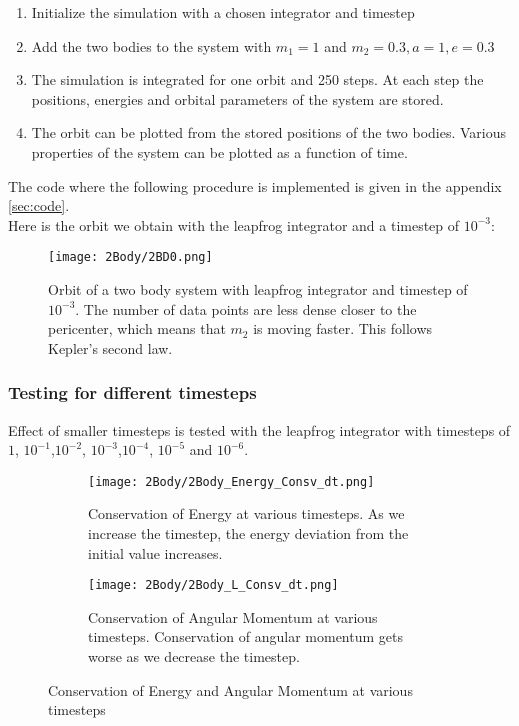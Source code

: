 \documentclass[12pt,a4paper]{article}
\begin{document}
\begin{enumerate}
  \item Initialize the simulation with a chosen integrator and timestep
  \item Add the two bodies to the system with $m_1 = 1$ and $m_2 = 0.3, a=1, e=0.3 $
  \item The simulation is integrated for one orbit and 250 steps. At each step the positions, energies and orbital parameters of the system are stored.
  \item The orbit can be plotted from the stored positions of the two bodies. Various properties of the system can be plotted as a function of time.
\end{enumerate}
The code where the following procedure is implemented is given in the appendix \ref{sec:code}.\\
Here is the orbit we obtain with the leapfrog integrator and a timestep of $10^{-3}$:
\begin{figure}[H]
  \centering
  \texttt{[image: 2Body/2BD0.png]}
  \caption{Orbit of a two body system with leapfrog integrator and timestep of $10^{-3}$. The number of data points are less dense closer to the pericenter, which means that $m_2$ is moving faster. This follows Kepler's second law.}
  \label{fig:leapfrog_1e-3}
\end{figure}

\subsubsection{Testing for different timesteps}
Effect of smaller timesteps is tested with the leapfrog integrator with timesteps of $1$, $10^{-1}$,$10^{-2}$, $10^{-3}$,$10^{-4}$, $10^{-5}$ and $10^{-6}$.\\
\begin{figure}[H]
  \centering
  \begin{subfigure}{0.49\textwidth}
    \texttt{[image: 2Body/2Body\_Energy\_Consv\_dt.png]}
    \caption{Conservation of Energy at various timesteps. As we increase the timestep, the energy deviation from the initial value increases.}
    \label{fig:dt_e}  
  \end{subfigure}
  \begin{subfigure}{0.49\textwidth}
    \texttt{[image: 2Body/2Body\_L\_Consv\_dt.png]}
    \caption{Conservation of Angular Momentum at various timesteps. Conservation of angular momentum gets worse as we decrease the timestep.}
    \label{fig:dt_L}  
  \end{subfigure}
  \caption{Conservation of Energy and Angular Momentum at various timesteps}
\end{figure}
\end{document}
